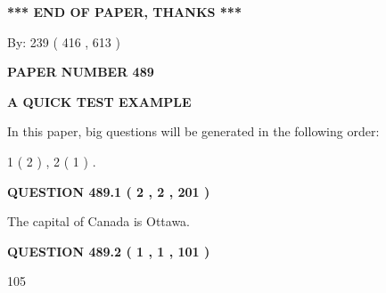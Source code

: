 \documentclass[12pt]{article}
\begin{document}
   
   
   
   
\vspace{1.0in} 
{\textbf{\large{ *** END OF PAPER, THANKS *** }}} 
   
   
\hspace{1.0in} By: 
 239 ( 416 ,  613 )
   
   
   
   
\newpage 
\setcounter{page}{ 
   489001 } 
   
   
   
   
 {\textbf{ \Large{ PAPER NUMBER  489  }}}
   
   
\vspace{0.2in}
   
   
   
   
   
   
 \vspace{0.2in}
{\LARGE {\textbf{ A QUICK TEST EXAMPLE}}}
   
   
   
\vspace{0.2in}
   
In this paper, big questions will be generated in the following order: 
   
   
   1 ( 2 )
 ,
   2 ( 1 )
 .
  
\vspace{0.2in}
  
{\textbf{\Large{QUESTION
489.1 
 ( 2 , 2 , 201 )
}}}
  
  
 
 
\noindent{}
 
 
The capital of Canada is Ottawa.
 
 
 
 
  
\vspace{0.2in}
  
{\textbf{\Large{QUESTION
489.2 
 ( 1 , 1 , 101 )
}}}
  
  
 
 
\noindent{}

105
 
 
 
 
\noindent{}
\end{document}

